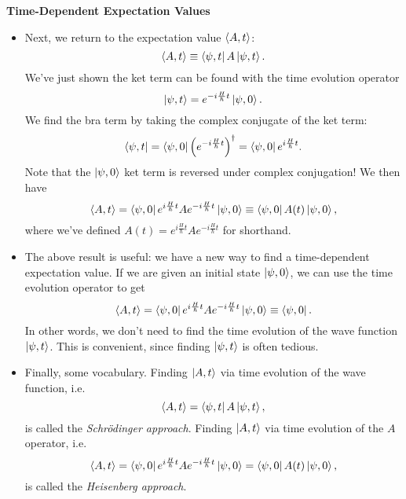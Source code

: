 \documentclass[11pt, a4paper]{article}
\newcommand{\Schro}{Schr\"{o}dinger\xspace}
\newcommand{\tev}{e^{-i\frac{H}{\hbar}t}}  %
\newcommand{\tevp}{e^{i\frac{H}{\hbar}t}}  %
\begin{document}
\textbf{Time-Dependent Expectation Values}
\begin{itemize}
	
	\item Next, we return to the expectation value $ \ev{A, t} $:
	\begin{equation*}
		\ev{A, t} \equiv \bra{\psi, t} A \ket{\psi, t}.
	\end{equation*}
	We've just shown the ket term can be found with the time evolution operator
	\begin{equation*}
		\ket{\psi, t} = \tev \ket{\psi, 0}.
	\end{equation*}
	We find the bra term by taking the complex conjugate of the ket term:
	\begin{equation*}
		\bra{\psi, t} = \bra{\psi, 0}\left(\tev\right)^{\dagger} = \bra{\psi, 0}\tevp.
	\end{equation*}
	Note that the $ \ket{\psi, 0} $ ket term is reversed under complex conjugation! We then have
	\begin{equation*}
		\ev{A, t} = \bra{\psi, 0}\tevp A \tev \ket{\psi, 0} \equiv  \bra{\psi, 0} A(t) \ket{\psi, 0},
	\end{equation*}
	where we've defined $ A(t) = \tevp A \tev  $ for shorthand.
	
	\item The above result is useful: we have a new way to find a time-dependent expectation value. If we are given an initial state $ \ket{\psi, 0} $, we can use the time evolution operator to get
	\begin{equation*}
		\ev{A, t} = \bra{\psi, 0}\tevp A \tev \ket{\psi, 0} \equiv  \bra{\psi, 0}.
	\end{equation*}
	In other words, we don't need to find the time evolution of the wave function $ \ket{\psi, t} $. This is convenient, since finding $ \ket{\psi, t} $ is often tedious.
	
	\item Finally, some vocabulary. Finding $ \ket{A, t} $ via time evolution of the wave function, i.e. 
	\begin{equation*}
		\ev{A, t} = \bra{\psi, t} A \ket{\psi, t},
	\end{equation*}
	is called the \textit{\Schro approach}. Finding $ \ket{A, t} $ via time evolution of the $ A $ operator, i.e. 
	\begin{equation*}
		\ev{A, t} = \bra{\psi, 0}\tevp A \tev \ket{\psi, 0} = \bra{\psi, 0} A(t) \ket{\psi, 0},
	\end{equation*}
	is called the \textit{Heisenberg approach}. 
\end{itemize}
\end{document}
